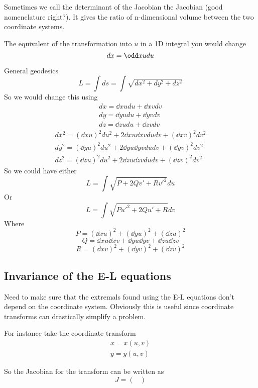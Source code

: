 \documentclass{X:/Documents/Coding/Latex/myassignment}
\begin{document}
Sometimes we call the determinant of the Jacobian the Jacobian (good nomenclature right?). It gives the ratio of n-dimensional volume between the two coordinate systems.


The equivalent of the transformation into $u$ in a 1D integral you would change
\[dx = \odd xu du\]



General geodesics
\[L = \int ds = \int \sqrt{dx^2+dy^2+dz^2}\]
So we would change this using
\begin{align*}
	dx = \dd xu du + \dd xv dv\\
	dy = \dd yu du + \dd yv dv\\
	dz = \dd zu du + \dd zv dv
\end{align*}
\begin{align*}
	dx^2 = \left(\dd xu\right)^2 du^2 + 2 \dd xu \dd xv du dv + \left(\dd xv\right)^2 dv^2\\
	dy^2 = \left(\dd yu\right)^2 du^2 + 2 \dd yu \dd yv du dv + \left(\dd yv\right)^2 dv^2\\
	dz^2 = \left(\dd zu\right)^2 du^2 + 2 \dd zu \dd zv du dv + \left(\dd zv\right)^2 dv^2
\end{align*}
So we could have either 
\[L = \int \sqrt{P + 2Q v' + Rv'^2} du\]
Or
\[L = \int \sqrt{Pu'^2 + 2Q u' + R} dv\]
Where
\[P = \left(\dd xu\right)^2 +\left(\dd yu\right)^2 +\left(\dd zu\right)^2  \]
\[Q = \dd xu \dd xv + \dd yu \dd yv + \dd zu \dd zv\]
\[R = \left(\dd xv\right)^2 +\left(\dd yv\right)^2 +\left(\dd zv\right)^2  \]




\subsection{Invariance of the E-L equations}
Need to make sure that the extremals found using the E-L equations don't depend on the coordinate system. Obviously this is useful since coordinate transforms can drastically simplify a problem.

For instance take the coordinate transform
\begin{align*}
	x = x(u,v)\\
	y = y(u,v)
\end{align*}


So the Jacobian for the transform can be written as
\[J = \begin{pmatrix}
	
\end{pmatrix}\]
\end{document}
